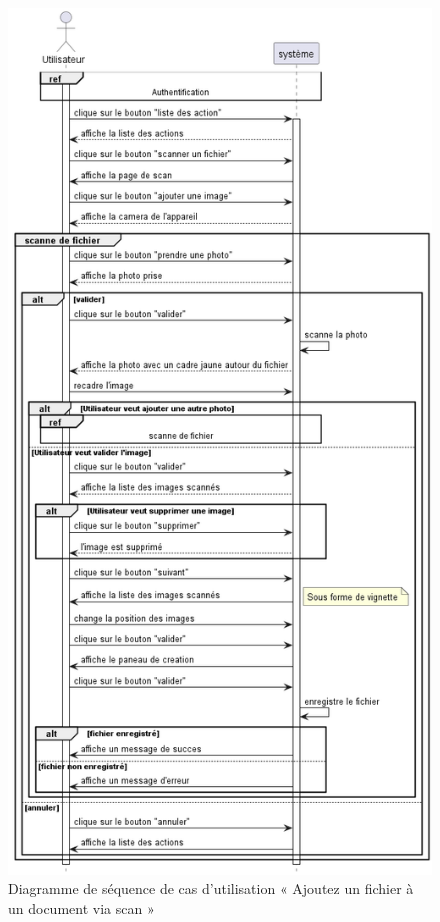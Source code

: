 \begin{figure}[H]
  \centering
  \includegraphics[height=1\textheight]{out/diagrams/documents/add_scan_file/add_scan_file}
  \caption{Diagramme de séquence de cas d'utilisation « Ajoutez un fichier à un document via scan  »}
  \label{fig:sequence_add_scan_file}
\end{figure}
